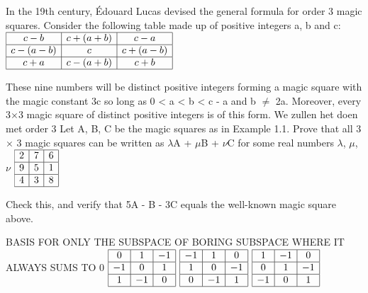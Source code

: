 \documentclass{ximera}
\begin{document}
In the 19th century, Édouard Lucas devised the general formula for order 3 magic squares. Consider the following table made up of positive integers a, b and c:
\(
\begin{array}{|c|c|c|}
\hline
c - b & c + (a + b) & c - a \\
\hline
c - (a - b) & c & c + (a - b) \\
\hline
c + a & c - (a + b) & c + b \\
\hline
\end{array}
\)

These nine numbers will be distinct positive integers forming a magic square with the magic constant 3c so long as 0 < a < b < c - a and b $\neq$ 2a. Moreover, every 3$\times$3 magic square of distinct positive integers is of this form. 
We zullen het doen met order 3
Let A, B, C be the magic squares as in Example 1.1. Prove that all 3 $\times$ 3
magic squares can be written as $\lambda$A + $\mu$B + $\nu$C for some real numbers $\lambda$, $\mu$, $\nu$
\(
\begin{array}{|c|c|c|}
\hline
2 & 7 & 6 \\
\hline
9 & 5 & 1 \\
\hline
4 & 3 & 8 \\
\hline
\end{array}
\)

Check this, and verify that 5A - B - 3C equals the well-known magic square above.

BASIS FOR ONLY THE SUBSPACE OF BORING SUBSPACE WHERE IT ALWAYS SUMS TO
0
\(
\begin{array}{|c|c|c|}
\hline
0 & 1 & -1 \\
\hline
-1 & 0 & 1 \\
\hline
1 & -1 & 0 \\
\hline
\end{array}
\)
\(
\begin{array}{|c|c|c|}
\hline
-1 & 1 & 0 \\
\hline
1 & 0 & -1 \\
\hline
0 & -1 & 1 \\
\hline
\end{array}
\)
\(
\begin{array}{|c|c|c|}
\hline
1 & -1 & 0 \\
\hline
0 & 1 & -1 \\
\hline
-1 & 0 & 1 \\
\hline
\end{array}
\)
\end{document}
